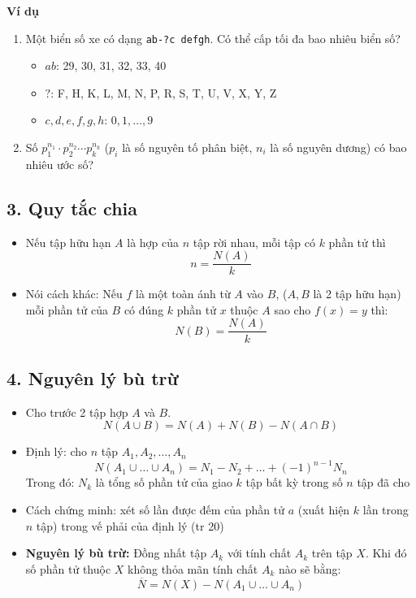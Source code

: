 \documentclass[12pt,a4paper]{article}
\begin{document}
\textbf{Ví dụ}
\begin{enumerate}
    \item Một biển số xe có dạng \texttt{ab-?c defgh}. Có thể cấp tối đa bao nhiêu biển số?
    \begin{itemize}[label=+]
        \item $ab$: 29, 30, 31, 32, 33, 40
        \item $?$: F, H, K, L, M, N, P, R, S, T, U, V, X, Y, Z
        \item $c, d, e, f, g, h$: $0, 1, \dots, 9$
    \end{itemize}
    \item Số $p_1^{n_1} \cdot p_2^{n_2} \cdots p_k^{n_k}$ ($p_i$ là số nguyên tố phân biệt, $n_i$ là số nguyên dương) có bao nhiêu ước số?
\end{enumerate}

\subsection*{3. Quy tắc chia}
\begin{itemize}
    \item Nếu tập hữu hạn $A$ là hợp của $n$ tập rời nhau, mỗi tập có $k$ phần tử thì
    $$n = \frac{N(A)}{k}$$
    \item Nói cách khác: Nếu $f$ là một toàn ánh từ $A$ vào $B$, ($A, B$ là 2 tập hữu hạn) mỗi phần tử của $B$ có đúng $k$ phần tử $x$ thuộc $A$ sao cho $f(x) = y$ thì:
    $$N(B) = \frac{N(A)}{k}$$
\end{itemize}

\subsection*{4. Nguyên lý bù trừ}
\begin{itemize}
    \item Cho trước 2 tập hợp $A$ và $B$.
    $$N(A \cup B) = N(A) + N(B) - N(A \cap B)$$
    \item Định lý: cho $n$ tập $A_1, A_2, \dots, A_n$
    $$N(A_1 \cup \dots \cup A_n) = N_1 - N_2 + \dots + (-1)^{n-1}N_n$$
    Trong đó: $N_k$ là tổng số phần tử của giao $k$ tập bất kỳ trong số $n$ tập đã cho
    \item Cách chứng minh: xét số lần được đếm của phần tử $a$ (xuất hiện $k$ lần trong $n$ tập) trong vế phải của định lý (tr 20)
\end{itemize}

\begin{itemize}
    \item \textbf{Nguyên lý bù trừ:} Đồng nhất tập $A_k$ với tính chất $A_k$ trên tập $X$. Khi đó số phần tử thuộc $X$ không thỏa mãn tính chất $A_k$ nào sẽ bằng:
    $$\overline{N} = N(X) - N(A_1 \cup \dots \cup A_n)$$
\end{itemize}
\end{document}
